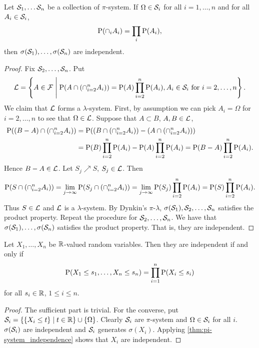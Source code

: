 \begin{theorem}\label{thm:pi-system_independence}
    Let $\S_1,\ldots\S_n$ be a collection of $\pi$-system. If $\Omega\in \S_i$ 
    for all $i = 1,\ldots,n$ and for all $A_i\in\S_i$, 
    \begin{equation*}
        \P(\cap_i A_i) = \prod_i \P(A_i), 
    \end{equation*}
    then $\sigma(\S_1),\ldots,\sigma(\S_n)$ are independent. 
\end{theorem}
\begin{proof}
    Fix $\S_2,\ldots,\S_n$. Put 
    \begin{equation*}
        \L = \Set{A\in\F}{\P(A\cap (\cap_{i=2}^n A_i)) = \P(A)\prod_{i=2}^n \P(A_i), A_i\in\S_i\text{ for $i = 2,\ldots,n$}}.
    \end{equation*}
    We claim that $\L$ forms a $\lambda$-system. First, by assumption we can 
    pick $A_i = \Omega$ for $i=2,\ldots,n$ to see that $\Omega\in\L$. Suppose 
    that $A\subset B$, $A,B\in\L$, 
    \begin{equation*}
        \begin{split}
            \P((B-A)\cap(\cap_{i=2}^n A_i)) 
            &= \P((B\cap(\cap_{i=2}^n A_i)) - (A\cap(\cap_{i=2}^n A_i))) \\ 
            &= \P(B)\prod_{i=2}^n\P(A_i) - \P(A)\prod_{i=2}^n\P(A_i) 
            = \P(B-A)\prod_{i=2}^n\P(A_i).
        \end{split}
    \end{equation*}
    Hence $B-A\in\L$. Let $S_j\nearrow S$, $S_j\in\L$. Then 
    \begin{equation*}
        \P(S\cap(\cap_{i=2}^nA_i)) = \lim_{j\to\infty} \P(S_j\cap(\cap_{i=2}^nA_i)) 
        = \lim_{j\to\infty}\P(S_j)\prod_{i=2}^n\P(A_i) 
        = \P(S)\prod_{i=2}^n\P(A_i).
    \end{equation*} 
    Thus $S\in\L$ and $\L$ is a $\lambda$-system. By Dynkin's $\pi$-$\lambda$, 
    $\sigma(\S_1),\S_2,\ldots,\S_n$ satisfies the product property. Repeat the 
    procedure for $\S_2,\ldots,\S_n$. We have that $\sigma(\S_1),\ldots,\sigma(\S_n)$ 
    satisfies the product property. That is, they are independent. 
\end{proof}

\begin{corollary}
    Let $X_1,\ldots,X_n$ be $\R$-valued random variables. Then they are independent 
    if and only if 
    \begin{equation*}
        \P(X_1\leq s_1,\ldots, X_n\leq s_n) = \prod_{i=1}^n \P(X_i\leq s_i)
    \end{equation*}
    for all $s_i\in\R$, $1\leq i\leq n$.
\end{corollary}
\begin{proof}
    The sufficient part is trivial. For the converse, put 
    $\S_i = \Set{\set{X_i\leq t}}{t\in\R}\cup\set{\Omega}$. Clearly $\S_i$ 
    are $\pi$-system and $\Omega\in\S_i$ for all $i$. $\sigma(\S_i)$ are 
    independent and $\S_i$ generates $\sigma(X_i)$. Applying \cref{thm:pi-system_independence} 
    shows that $X_i$ are independent.  
\end{proof}

